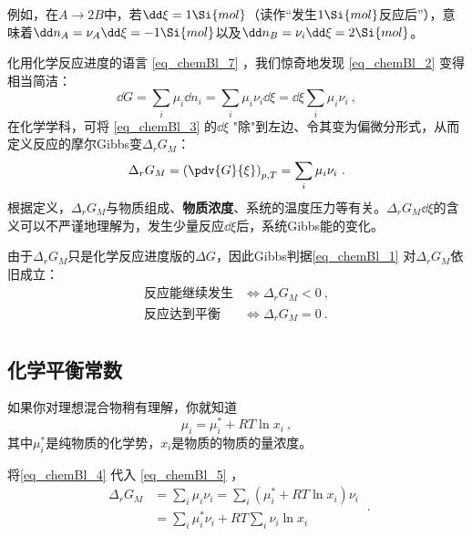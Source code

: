 例如，在$A\to2B$中，若$\dd \xi=1 \Si{mol}$（读作“发生$1 \Si{mol}$反应后”），意味着$\dd n_A = \nu_A \dd \xi = - 1 \Si{mol}$以及$\dd n_B = \nu_i \dd \xi = 2 \Si{mol}$。

化用化学反应进度的语言 \autoref{eq_chemBl_7} ，我们惊奇地发现 \autoref{eq_chemBl_2} 变得相当简洁：
\begin{equation}\label{eq_chemBl_3}
\dd G = \sum_i \mu_i \dd n_i = \sum_i \mu_i \nu_i \dd \xi =  \dd \xi \sum_i \mu_i \nu_i~,
\end{equation}
在化学学科，可将 \autoref{eq_chemBl_3} 的$\dd \xi$ "除"到左边、令其变为偏微分形式，从而定义反应的摩尔Gibbs变$\Delta_r G_M$：
\begin{equation} \label{eq_chemBl_5}
\Delta_r G_M = \left(\pdv{G}{\xi}\right)_{p,T} = \sum_i \mu_i \nu_i~.
\end{equation}
根据定义，$\Delta_r G_M$与物质组成、\textbf{物质浓度}、系统的温度压力等有关。$\Delta_r G_M \dd \xi$的含义可以不严谨地理解为，发生少量反应$\dd \xi$后，系统Gibbs能的变化。

由于$\Delta_r G_M$只是化学反应进度版的$\Delta G$，因此Gibbs判据\autoref{eq_chemBl_1} 对$\Delta_r G_M$依旧成立：
\begin{equation}\label{eq_chemBl_6}
\begin{aligned}
\text{反应能继续发生} &\Longleftrightarrow \Delta_r G_M < 0~,\\
\text{反应达到平衡} &\Longleftrightarrow \Delta_r G_M = 0~.\\
\end{aligned}
\end{equation}

\subsection{化学平衡常数}
如果你对理想混合物稍有理解，你就知道
\begin{equation}\label{eq_chemBl_4}
\mu_i = \mu_i^* + RT \ln x_i~,
\end{equation}
其中$\mu_i^*$是纯物质的化学势，$x_i$是物质的物质的量浓度。

将\autoref{eq_chemBl_4} 代入 \autoref{eq_chemBl_5} ，
\begin{equation}
\begin{aligned}
\Delta_r G_M &= \sum_i \mu_i \nu_i = \sum_i (\mu_i^* + RT \ln x_i) \nu_i\\
&= \sum_i \mu_i^* \nu_i + RT \sum_i \nu_i \ln x_i
\end{aligned}~.
\end{equation}

